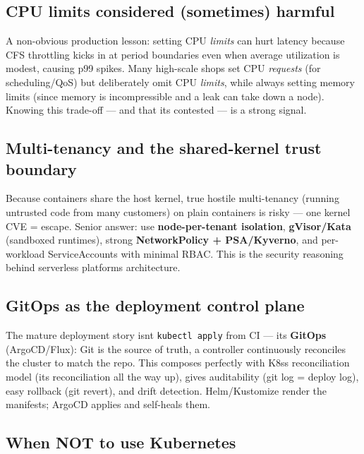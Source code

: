 \documentclass[11pt]{article}
\begin{document}
\subsection{CPU limits considered (sometimes) harmful}\label{cpu-limits-considered-sometimes-harmful}

A non-obvious production lesson: setting CPU \emph{limits} can hurt latency because CFS throttling kicks in at period boundaries even when average utilization is modest, causing p99 spikes. Many high-scale shops set CPU \emph{requests} (for scheduling/QoS) but deliberately omit CPU \emph{limits}, while always setting memory limits (since memory is incompressible and a leak can take down a node). Knowing this trade-off --- and that it\textquotesingle s contested --- is a strong signal.

\subsection{Multi-tenancy and the shared-kernel trust boundary}\label{multi-tenancy-and-the-shared-kernel-trust-boundary}

Because containers share the host kernel, true hostile multi-tenancy (running untrusted code from many customers) on plain containers is risky --- one kernel CVE = escape. Senior answer: use \textbf{node-per-tenant isolation}, \textbf{gVisor/Kata} (sandboxed runtimes), strong \textbf{NetworkPolicy + PSA/Kyverno}, and per-workload ServiceAccounts with minimal RBAC. This is the security reasoning behind serverless platforms\textquotesingle{} architecture.

\subsection{GitOps as the deployment control plane}\label{gitops-as-the-deployment-control-plane}

The mature deployment story isn\textquotesingle t \texttt{kubectl\ apply} from CI --- it\textquotesingle s \textbf{GitOps} (ArgoCD/Flux): Git is the source of truth, a controller continuously reconciles the cluster to match the repo. This composes perfectly with K8s\textquotesingle s reconciliation model (it\textquotesingle s reconciliation all the way up), gives auditability (git log = deploy log), easy rollback (git revert), and drift detection. Helm/Kustomize render the manifests; ArgoCD applies and self-heals them.

\subsection{When NOT to use Kubernetes}\label{when-not-to-use-kubernetes}
\end{document}
